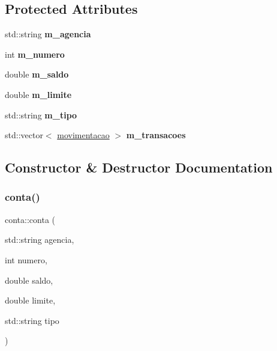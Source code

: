 \subsection*{Protected Attributes}
\begin{DoxyCompactItemize}
\item 
\mbox{\label{classconta_af6890014c4ac1bf8356485603a9904b8}} 
std\+::string {\bfseries m\+\_\+agencia}
\item 
\mbox{\label{classconta_a1aea638dc5bb9385374fba20f6ffe201}} 
int {\bfseries m\+\_\+numero}
\item 
\mbox{\label{classconta_a411fb41f6e84b6d8ccb1153025b76ee7}} 
double {\bfseries m\+\_\+saldo}
\item 
\mbox{\label{classconta_a71e60ccd4e8a2492647b5d07ee1444b2}} 
double {\bfseries m\+\_\+limite}
\item 
\mbox{\label{classconta_ae6bde0ca5a0777d9bb69676193de931d}} 
std\+::string {\bfseries m\+\_\+tipo}
\item 
\mbox{\label{classconta_ac505bb6ecfe199c5f2d227359bf0821d}} 
std\+::vector$<$ \mbox{\hyperlink{classmovimentacao}{movimentacao}} $>$ {\bfseries m\+\_\+transacoes}
\end{DoxyCompactItemize}


\subsection{Constructor \& Destructor Documentation}
\mbox{\label{classconta_a56dd4dac755dbbcda1d7fdb61bb8245f}} 
\subsubsection{\texorpdfstring{conta()}{conta()}}
{\footnotesize\ttfamily conta\+::conta (\begin{DoxyParamCaption}\item[{std\+::string}]{agencia,  }\item[{int}]{numero,  }\item[{double}]{saldo,  }\item[{double}]{limite,  }\item[{std\+::string}]{tipo }\end{DoxyParamCaption})}



